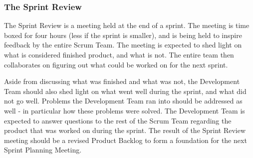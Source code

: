 \subsubsection{The Sprint Review}

The Sprint Review is a meeting held at the end of a sprint. The meeting is time
boxed for four hours (less if the sprint is smaller), and is being held to
inspire feedback by the entire Scrum Team\cite{scrumguide11}. 
The meeting is expected to shed light on what is considered finished product,
and what is not\cite{scrumguide11}. 
The entire team then collaborates on figuring out what could be worked on for the next sprint\cite{scrumguide11}. 


Aside from discussing what was finished and what was not, the Development Team should also 
shed light on what went well during the sprint, and what did not go well\cite{scrumguide11}. 
Problems the Development Team ran into should be addressed as well - in
particular how these problems were solved\cite{scrumguide11}. 
The Development Team is expected to answer questions to the rest of the Scrum
Team regarding the product that was worked on during the sprint\cite{scrumguide11}. 
The result of the Sprint Review meeting should be a revised Product Backlog 
to form a foundation for the next Sprint Planning 
Meeting\cite{scrumguide11}.